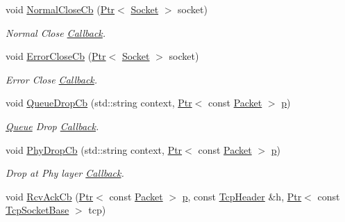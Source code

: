 \begin{DoxyCompactItemize}
\item 
void \hyperlink{classns3_1_1TcpGeneralTest_abae34b473c7370e0e7c65c985526ef76}{Normal\+Close\+Cb} (\hyperlink{classns3_1_1Ptr}{Ptr}$<$ \hyperlink{classns3_1_1Socket}{Socket} $>$ socket)
\begin{DoxyCompactList}\small\item\em Normal Close \hyperlink{classns3_1_1Callback}{Callback}. \end{DoxyCompactList}\item 
void \hyperlink{classns3_1_1TcpGeneralTest_a06320f4c0056798fc17a37e6db60b503}{Error\+Close\+Cb} (\hyperlink{classns3_1_1Ptr}{Ptr}$<$ \hyperlink{classns3_1_1Socket}{Socket} $>$ socket)
\begin{DoxyCompactList}\small\item\em Error Close \hyperlink{classns3_1_1Callback}{Callback}. \end{DoxyCompactList}\item 
void \hyperlink{classns3_1_1TcpGeneralTest_a56f00dc6598bced9ee9faf5fa3d688ee}{Queue\+Drop\+Cb} (std\+::string context, \hyperlink{classns3_1_1Ptr}{Ptr}$<$ const \hyperlink{classns3_1_1Packet}{Packet} $>$ \hyperlink{lte__link__budget__x2__handover__measures_8m_ac9de518908a968428863f829398a4e62}{p})
\begin{DoxyCompactList}\small\item\em \hyperlink{classns3_1_1Queue}{Queue} Drop \hyperlink{classns3_1_1Callback}{Callback}. \end{DoxyCompactList}\item 
void \hyperlink{classns3_1_1TcpGeneralTest_aa52f74819a6289338e7a5835fb76c5fa}{Phy\+Drop\+Cb} (std\+::string context, \hyperlink{classns3_1_1Ptr}{Ptr}$<$ const \hyperlink{classns3_1_1Packet}{Packet} $>$ \hyperlink{lte__link__budget__x2__handover__measures_8m_ac9de518908a968428863f829398a4e62}{p})
\begin{DoxyCompactList}\small\item\em Drop at Phy layer \hyperlink{classns3_1_1Callback}{Callback}. \end{DoxyCompactList}\item 
void \hyperlink{classns3_1_1TcpGeneralTest_ac15d659210d757c94b5b3c27d6fad11b}{Rcv\+Ack\+Cb} (\hyperlink{classns3_1_1Ptr}{Ptr}$<$ const \hyperlink{classns3_1_1Packet}{Packet} $>$ \hyperlink{lte__link__budget__x2__handover__measures_8m_ac9de518908a968428863f829398a4e62}{p}, const \hyperlink{classns3_1_1TcpHeader}{Tcp\+Header} \&h, \hyperlink{classns3_1_1Ptr}{Ptr}$<$ const \hyperlink{classns3_1_1TcpSocketBase}{Tcp\+Socket\+Base} $>$ tcp)

\end{DoxyCompactItemize}
